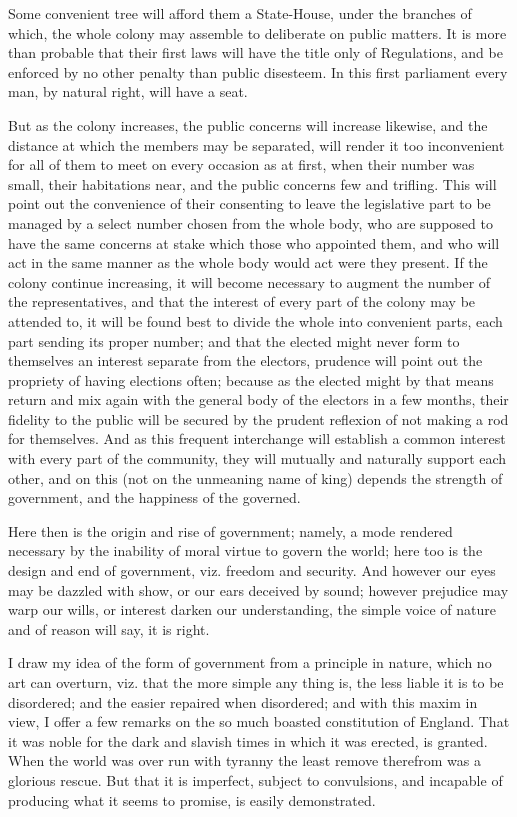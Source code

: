 \documentclass[12pt,oneside]{memoir}
\begin{document}
Some convenient tree will afford them a State-House, under the branches of which, the whole colony may assemble to deliberate on public matters. It is more than probable that their first laws will have the title only of Regulations, and be enforced by no other penalty than public disesteem. In this first parliament every man, by natural right, will have a seat.

But as the colony increases, the public concerns will increase likewise, and the distance at which the members may be separated, will render it too inconvenient for all of them to meet on every occasion as at first, when their number was small, their habitations near, and the public concerns few and trifling. This will point out the convenience of their consenting to leave the legislative part to be managed by a select number chosen from the whole body, who are supposed to have the same concerns at stake which those who appointed them, and who will act in the same manner as the whole body would act were they present. If the colony continue increasing, it will become necessary to augment the number of the representatives, and that the interest of every part of the colony may be attended to, it will be found best to divide the whole into convenient parts, each part sending its proper number; and that the elected might never form to themselves an interest separate from the electors, prudence will point out the propriety of having elections often; because as the elected might by that means return and mix again with the general body of the electors in a few months, their fidelity to the public will be secured by the prudent reflexion of not making a rod for themselves. And as this frequent interchange will establish a common interest with every part of the community, they will mutually and naturally support each other, and on this (not on the unmeaning name of king) depends the strength of government, and the happiness of the governed.

Here then is the origin and rise of government; namely, a mode rendered necessary by the inability of moral virtue to govern the world; here too is the design and end of government, viz. freedom and security. And however our eyes may be dazzled with show, or our ears deceived by sound; however prejudice may warp our wills, or interest darken our understanding, the simple voice of nature and of reason will say, it is right.

I draw my idea of the form of government from a principle in nature, which no art can overturn, viz. that the more simple any thing is, the less liable it is to be disordered; and the easier repaired when disordered; and with this maxim in view, I offer a few remarks on the so much boasted constitution of England. That it was noble for the dark and slavish times in which it was erected, is granted. When the world was over run with tyranny the least remove therefrom was a glorious rescue. But that it is imperfect, subject to convulsions, and incapable of producing what it seems to promise, is easily demonstrated.
\end{document}
